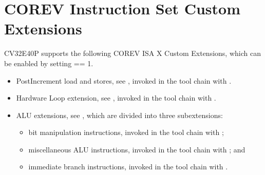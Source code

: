\documentclass[letterpaper,10pt,english]{sphinxmanual}
\begin{document}
\chapter{CORE\sphinxhyphen{}V Instruction Set Custom Extensions}
\label{\detokenize{instruction_set_extensions:core-v-instruction-set-custom-extensions}}\label{\detokenize{instruction_set_extensions:custom-isa-extensions}}\label{\detokenize{instruction_set_extensions::doc}}
\sphinxAtStartPar
CV32E40P supports the following CORE\sphinxhyphen{}V ISA X Custom Extensions, which can be enabled by setting  == 1.
\begin{itemize}
\item {} 
\sphinxAtStartPar
Post\sphinxhyphen{}Increment load and stores, see {\hyperref[\detokenize{instruction_set_extensions:corev-load-store}]{}}, invoked in the tool chain with .

\item {} 
\sphinxAtStartPar
Hardware Loop extension, see {\hyperref[\detokenize{instruction_set_extensions:corev-hardware-loop}]{}}, invoked in the tool chain with .

\item {} 
\sphinxAtStartPar
ALU extensions, see {\hyperref[\detokenize{instruction_set_extensions:corev-alu}]{}}, which are divided into three sub\sphinxhyphen{}extensions:
\begin{itemize}
\item {} 
\sphinxAtStartPar
bit manipulation instructions, invoked in the tool chain with ;

\item {} 
\sphinxAtStartPar
miscellaneous ALU instructions, invoked in the tool chain with ; and

\item {} 
\sphinxAtStartPar
immediate branch instructions, invoked in the tool chain with .

\end{itemize}


\end{itemize}
\end{document}
